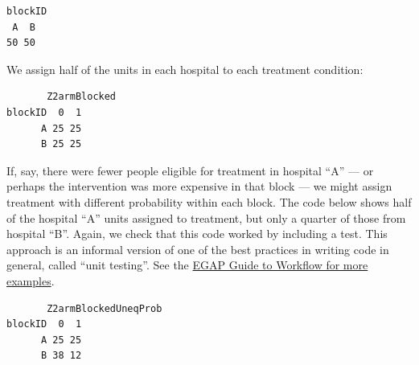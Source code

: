 \documentclass[
  12pt,
]{book}
\newenvironment{Shaded}{\begin{snugshade}}{\end{snugshade}}
\newcommand{\DataTypeTok}[1]{\textcolor[rgb]{0.13,0.29,0.53}{#1}}
\newcommand{\DecValTok}[1]{\textcolor[rgb]{0.00,0.00,0.81}{#1}}
\newcommand{\FloatTok}[1]{\textcolor[rgb]{0.00,0.00,0.81}{#1}}
\newcommand{\KeywordTok}[1]{\textcolor[rgb]{0.13,0.29,0.53}{\textbf{#1}}}
\newcommand{\NormalTok}[1]{#1}
\newcommand{\OperatorTok}[1]{\textcolor[rgb]{0.81,0.36,0.00}{\textbf{#1}}}
\newcommand{\StringTok}[1]{\textcolor[rgb]{0.31,0.60,0.02}{#1}}
\theoremstyle{definition}
\theoremstyle{definition}
\theoremstyle{definition}
\theoremstyle{remark}
\begin{document}
\begin{verbatim}
blockID
 A  B 
50 50 
\end{verbatim}

We assign half of the units in each hospital to each treatment
condition:

\begin{Shaded}
\end{Shaded}

\begin{verbatim}
       Z2armBlocked
blockID  0  1
      A 25 25
      B 25 25
\end{verbatim}

If, say, there were fewer people eligible for treatment in hospital
``A'' --- or perhaps the intervention was more expensive in that block
--- we might assign treatment with different probability within each
block. The code below shows half of the hospital ``A'' units assigned to
treatment, but only a quarter of those from hospital ``B''. Again, we
check that this code worked by including a test. This approach is an
informal version of one of the best practices in writing code in
general, called ``unit testing''. See the
\href{https://rawgit.com/egap/methods-guides/master/workflow/workflow.html\#to-minimize-error-build-testing-into-the-code}{EGAP
Guide to Workflow for more examples}.

\begin{Shaded}
\end{Shaded}

\begin{verbatim}
       Z2armBlockedUneqProb
blockID  0  1
      A 25 25
      B 38 12
\end{verbatim}
\end{document}
